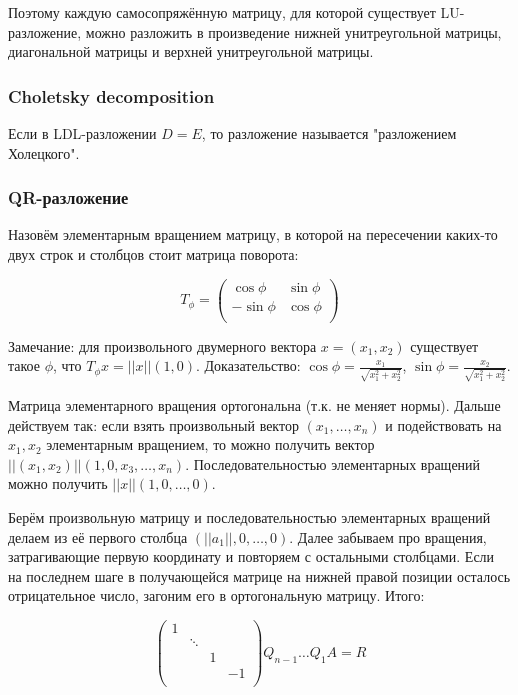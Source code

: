 \documentclass[12pt]{article}
\begin{document}
Поэтому каждую самосопряжённую матрицу, для которой существует LU-разложение, можно разложить в произведение нижней унитреугольной матрицы, диагональной матрицы и верхней унитреугольной матрицы.

\subsubsection{Choletsky decomposition}

Если в LDL-разложении $D = E$, то разложение называется "разложением Холецкого".

\subsubsection{QR-разложение}

Назовём элементарным вращением матрицу, в которой на пересечении каких-то двух строк и столбцов стоит матрица поворота:

\[
T_\phi =
\left(
\begin{matrix}
\cos \phi & \sin \phi \\
-\sin \phi & \cos \phi \\
\end{matrix}
\right)
\]

Замечание: для произвольного двумерного вектора $x = (x_1, x_2)$ существует такое $\phi$, что $T_\phi x = ||x|| (1, 0)$. Доказательство: $\cos \phi = \frac {x_1} {\sqrt{x_1^2 + x_2^2}}$, $\sin \phi = \frac {x_2} {\sqrt{x_1^2 + x_2^2}}$.

Матрица элементарного вращения ортогональна (т.к. не меняет нормы). Дальше действуем так: если взять произвольный вектор $(x_1, \ldots, x_n)$ и подействовать на $x_1, x_2$ элементарным вращением, то можно получить вектор $||(x_1, x_2)|| (1, 0, x_3, \ldots, x_n)$. Последовательностью элементарных вращений можно получить $||x|| (1, 0, \ldots, 0)$.

Берём произвольную матрицу и последовательностью элементарных вращений делаем из её первого столбца $(||a_1||, 0, \ldots, 0)$. Далее забываем про вращения, затрагивающие первую координату и повторяем с остальными столбцами. Если на последнем шаге в получающейся матрице на нижней правой позиции осталось отрицательное число, загоним его в ортогональную матрицу. Итого:

\[
\left(
\begin{smallmatrix}
1 &        &   &    \\
  & \ddots &   &    \\
  &        & 1 &    \\
  &        &   & -1 \\
\end{smallmatrix}
\right)
Q_{n - 1} \ldots Q_1 A = R
\]
\end{document}
